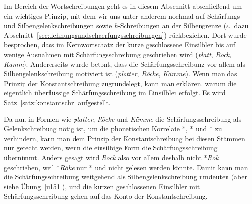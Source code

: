 Im Bereich der Wortschreibungen geht es in diesem Abschnitt abschließend um ein wichtiges Prinzip, mit dem wir uns unter anderem nochmal auf Schärfungs- und Silbengelenkschreibungen sowie \textit{h}-Schreibungen an der Silbengrenze (s.\ dazu Abschnitt~\ref{sec:dehnungsundschaerfungsschreibungen}) rückbeziehen.
Dort wurde besprochen, dass im Kernwortschatz der kurze geschlossene Einsilbler bis auf wenige Ausnahmen mit Schärfungsschreibung geschrieben wird (\textit{platt}, \textit{Rock}, \textit{Kamm}).
Andererseits wurde betont, dass die Schärfungsschreibung vor allem als Silbengelenkschreibung motiviert ist (\textit{platter}, \textit{Röcke}, \textit{Kämme}).
Wenn man das Prinzip der Konstantschreibung zugrundelegt, kann man erklären, warum die eigentlich überflüssige Schärfungsschreibung im Einsilbler erfolgt.
Es wird Satz~\ref{satz:konstantschr} aufgestellt.


Da nun in Formen wie \textit{platter}, \textit{Röcke} und \textit{Kämme} die Schärfungsschreibung als Gelenkschreibung nötig ist, um die phonetischen Korrelate *\textipa{[pla:t5]}, *\textipa{[r\o:k@]} und *\textipa{[kE:m@]} zu verhindern, kann man dem Prinzip der Konstantschreibung bei diesen Stämmen nur gerecht werden, wenn die einsilbige Form die Schärfungsschreibung übernimmt.
Anders gesagt wird \textit{Rock} also vor allem deshalb nicht *\textit{Rok} geschrieben, weil *\textit{Röke} nur *\textipa{[r\o:k@]} und nicht \textipa{[r{\oe}\Sgel{k}@]} gelesen werden könnte.
Damit kann man die Schärfungsschreibung weitgehend als Silbengelenkschreibung umdeuten (aber siehe Übung~\ref{u151}), und die kurzen geschlossenen Einsilbler mit Schärfungsschreibung gehen auf das Konto der Konstantschreibung.

